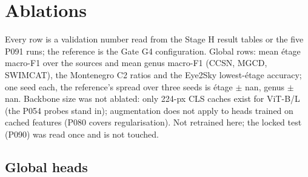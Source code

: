 \section{Ablations}

Every row is a validation number read from the Stage H result tables or the five P091 runs; the reference is the Gate G4 configuration. Global rows: mean étage macro-F1 over the sources and mean genus macro-F1 (CCSN, MGCD, SWIMCAT), the Montenegro C2 ratios and the Eye2Sky lowest-étage accuracy; one seed each, the reference's spread over three seeds is étage $\pm$ nan, genus $\pm$ nan. Backbone size was not ablated: only 224-px CLS caches exist for ViT-B/L (the P054 probes stand in); augmentation does not apply to heads trained on cached features (P080 covers regularisation). Not retrained here; the locked test (P090) was read once and is not touched.

\subsection{Global heads}


